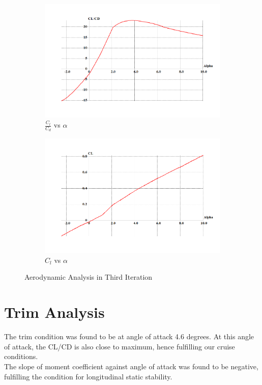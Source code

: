 \begin{figure}[H]
\medskip
\begin{subfigure}{0.6\textwidth}
\includegraphics[width = \linewidth]{clcd_vs_alpha__2_.png}
\caption{$\frac{C_l}{C_d}$ vs $\alpha$}
\end{subfigure}
\begin{subfigure}{0.6\textwidth}
\includegraphics[width = \linewidth]{cl_vs_alpha__1_.png}
\caption{$C_l$ vs $\alpha$}
\end{subfigure}
\caption{Aerodynamic Analysis in Third Iteration}
\end{figure}
\section{Trim Analysis}
The trim condition was found to be at angle of attack 4.6 degrees. At this angle of attack, the CL/CD is also close to maximum, hence fulfilling our cruise conditions.\\
The slope of moment coefficient against angle of attack was found to be negative, fulfilling the condition for longitudinal static stability.\\

